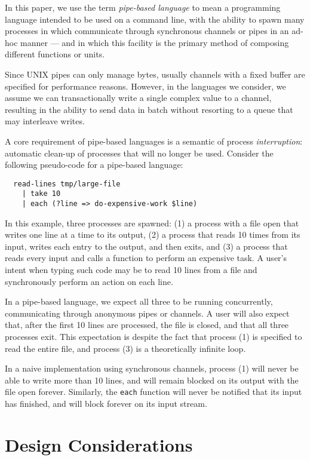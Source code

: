 \documentclass[sigplan,10pt,nosumlimits]{acmart}
\begin{document}
In this paper, we use the term \emph{pipe-based language} to mean a programming language intended to be used on a command line, with the ability to spawn many processes in which communicate through synchronous channels or pipes in an ad-hoc manner --- and in which this facility is the primary method of composing different functions or units.

Since UNIX pipes can only manage bytes, usually channels with a fixed buffer are specified for performance reasons. However, in the languages we consider, we assume we can transactionally write a single complex value to a channel, resulting in the ability to send data in batch without resorting to a queue that may interleave writes.

A core requirement of pipe-based languages is a semantic of process \emph{interruption}: automatic clean-up of processes that will no longer be used. Consider the following pseudo-code for a pipe-based language:

\begin{verbatim}
  read-lines tmp/large-file
    | take 10
    | each (?line => do-expensive-work $line)
\end{verbatim}
In this example, three processes are spawned: (1) a process with a file open that writes one line at a time to its output, (2) a process that reads 10 times from its input, writes each entry to the output, and then exits, and (3) a process that reads every input and calls a function to perform an expensive task.
A user's intent when typing such code may be to read 10 lines from a file and synchronously perform an action on each line.

In a pipe-based language, we expect all three to be running concurrently, communicating through anonymous pipes or channels.
A user will also expect that, after the first 10 lines are processed, the file is closed, and that all three processes exit.
This expectation is despite the fact that process (1) is specified to read the entire file, and process (3) is a theoretically infinite loop.

In a naive implementation using synchronous channels, process (1) will never be able to write more than 10 lines, and will remain blocked on its output with the file open forever.
Similarly, the \verb/each/ function will never be notified that its input has finished, and will block forever on its input stream.

\section{Design Considerations}
\end{document}
